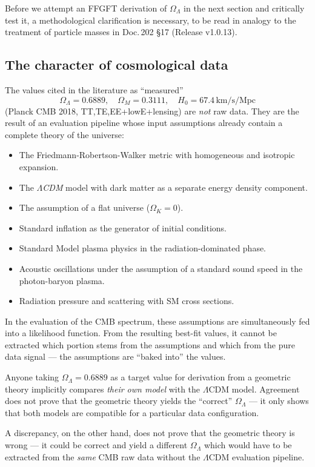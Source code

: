 Before we attempt an FFGFT derivation of \(\Omega_\Lambda\) in the next section and critically test it, a methodological clarification is necessary, to be read in analogy to the treatment of particle masses in Doc.\,202 \S17 (Release v1.0.13).

\subsection{The character of cosmological data}

The values cited in the literature as ``measured''
\begin{equation}
\Omega_\Lambda = 0.6889, \quad \Omega_M = 0.3111, \quad H_0 = 67.4\,\text{km/s/Mpc}
\end{equation}
(Planck CMB 2018, TT,TE,EE+lowE+lensing) are \emph{not} raw data. They are the result of an evaluation pipeline whose input assumptions already contain a complete theory of the universe:

\begin{itemize}
\item The Friedmann-Robertson-Walker metric with homogeneous and isotropic expansion.
\item The \emph{\(\Lambda\)CDM} model with dark matter as a separate energy density component.
\item The assumption of a flat universe (\(\Omega_K = 0\)).
\item Standard inflation as the generator of initial conditions.
\item Standard Model plasma physics in the radiation-dominated phase.
\item Acoustic oscillations under the assumption of a standard sound speed in the photon-baryon plasma.
\item Radiation pressure and scattering with SM cross sections.
\end{itemize}

In the evaluation of the CMB spectrum, these assumptions are simultaneously fed into a likelihood function. From the resulting best-fit values, it cannot be extracted which portion stems from the assumptions and which from the pure data signal --- the assumptions are ``baked into'' the values.

\begin{important}
Anyone taking \(\Omega_\Lambda = 0.6889\) as a target value for derivation from a geometric theory implicitly compares \emph{their own model} with the \(\Lambda\)CDM model. Agreement does not prove that the geometric theory yields the ``correct'' \(\Omega_\Lambda\) --- it only shows that both models are compatible for a particular data configuration.

A discrepancy, on the other hand, does not prove that the geometric theory is wrong --- it could be correct and yield a different \(\Omega_\Lambda\) which would have to be extracted from the \emph{same} CMB raw data without the \(\Lambda\)CDM evaluation pipeline.
\end{important}

